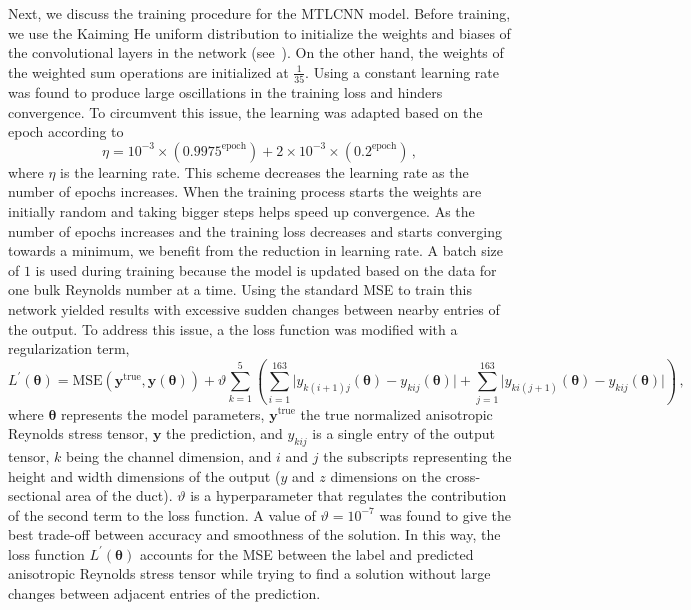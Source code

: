 \documentclass[11pt]{article}
\numberwithin{equation}{section}
\theoremstyle{plain}
\theoremstyle{definition}
\begin{document}
Next, we discuss the training procedure for the MTLCNN model. Before training, we use the Kaiming He uniform distribution to initialize the weights and biases of the convolutional layers in the network (see~\cite{he2015delving}). On the other hand, the weights of the weighted sum operations are initialized at $\frac{1}{35}$. %
Using a constant learning rate was found to produce large oscillations in the training loss and hinders convergence. %
To circumvent this issue, the learning was adapted based on the epoch according to 
\begin{equation}
    \eta=10^{-3}\times\left(0.9975^{\text{epoch}}\right)+2\times10^{-3}\times\left(0.2^{\text{epoch}}\right)\,,
    \label{eq:learning_rate}
\end{equation}
where $\eta$ is the learning rate. This scheme decreases the learning rate as the number of epochs increases. When the training process starts the weights are initially random and taking bigger steps helps speed up convergence. As the number of epochs increases and the training loss decreases and starts converging towards a minimum, we benefit from the reduction in learning rate. A batch size of $1$ is used during training because the model is updated based on the data for one bulk Reynolds number at a time. %
Using the standard MSE to train this network yielded results with excessive sudden changes between nearby entries of the output. %
To address this issue, a the loss function was modified with a regularization term,
\begin{equation}
    L^{\prime}(\boldsymbol{\theta})=\text{MSE}\left(\mathbf{y}^{\text{true}},\mathbf{y}(\boldsymbol{\theta})\right)+\vartheta\sum_{k=1}^{5}\left(\sum_{i=1}^{163}\lvert y_{k(i+1)j}(\boldsymbol{\theta})-y_{kij}(\boldsymbol{\theta})\rvert +\sum_{j=1}^{163}\lvert y_{ki(j+1)}(\boldsymbol{\theta})-y_{kij}(\boldsymbol{\theta})\rvert\right)\,,
    \label{eq:modified_mse}
\end{equation}
where $\boldsymbol{\theta}$ represents the model parameters, $\mathbf{y}^{\text{true}}$ the true normalized anisotropic Reynolds stress tensor, $\mathbf{y}$ the prediction, and $y_{kij}$ is a single entry of the output tensor, $k$ being the channel dimension, and $i$ and $j$ the subscripts representing the height and width dimensions of the output ($y$ and $z$ dimensions on the cross-sectional area of the duct). $\vartheta$ is a hyperparameter that regulates the contribution of the second term to the loss function. A value of $\vartheta=10^{-7}$ was found to give the best trade-off between accuracy and smoothness of the solution. %
In this way, the loss function $L^{\prime}(\boldsymbol{\theta})$ accounts for the MSE between the label and predicted anisotropic Reynolds stress tensor while trying to find a solution without large changes between adjacent entries of the prediction. 
\end{document}
